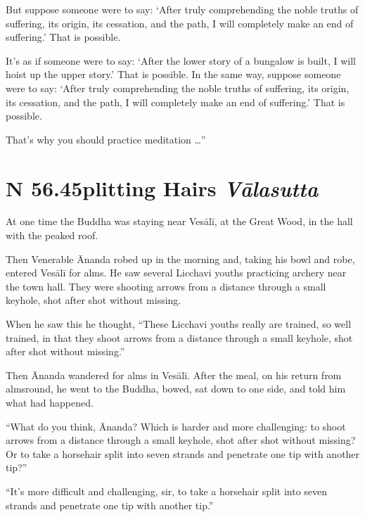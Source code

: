 \documentclass[12pt,openany]{book}%
\newcommand*{\suttatitleacronym}[1]{\smaller[2]{#1}\vspace*{.3em}}
\newcommand*{\suttatitletranslation}[1]{\linebreak{#1}}
\newcommand*{\suttatitleroot}[1]{\linebreak\smaller[2]\itshape{#1}}
\newcommand*{\tocacronym}[1]{\hspace*{-3.3em}{#1}\quad}
\newcommand*{\toctranslation}[1]{#1}
\newcommand*{\tocroot}[1]{(\textit{#1})}
\begin{document}
But suppose someone were to say: ‘After truly comprehending the noble truths of suffering, its origin, its cessation, and the path, I will completely make an end of suffering.’ That is possible. 

It’s as if someone were to say: ‘After the lower story of a bungalow is built, I will hoist up the upper story.’ That is possible. In the same way, suppose someone were to say: ‘After truly comprehending the noble truths of suffering, its origin, its cessation, and the path, I will completely make an end of suffering.’ That is possible. 

That’s why you should practice meditation …” 

%
\section*{{\suttatitleacronym SN 56.45}{\suttatitletranslation Splitting Hairs }{\suttatitleroot Vālasutta}}
\addcontentsline{toc}{section}{\tocacronym{SN 56.45} \toctranslation{Splitting Hairs } \tocroot{Vālasutta}}

At one time the Buddha was staying near \textsanskrit{Vesālī}, at the Great Wood, in the hall with the peaked roof. 

Then Venerable Ānanda robed up in the morning and, taking his bowl and robe, entered \textsanskrit{Vesālī} for alms. He saw several Licchavi youths practicing archery near the town hall. They were shooting arrows from a distance through a small keyhole, shot after shot without missing. 

When he saw this he thought, “These Licchavi youths really are trained, so well trained, in that they shoot arrows from a distance through a small keyhole, shot after shot without missing.” 

Then Ānanda wandered for alms in \textsanskrit{Vesālī}. After the meal, on his return from almsround, he went to the Buddha, bowed, sat down to one side, and told him what had happened. 

“What do you think, Ānanda? Which is harder and more challenging: to shoot arrows from a distance through a small keyhole, shot after shot without missing? Or to take a horsehair split into seven strands and penetrate one tip with another tip?” 

“It’s more difficult and challenging, sir, to take a horsehair split into seven strands and penetrate one tip with another tip.” 
\end{document}

